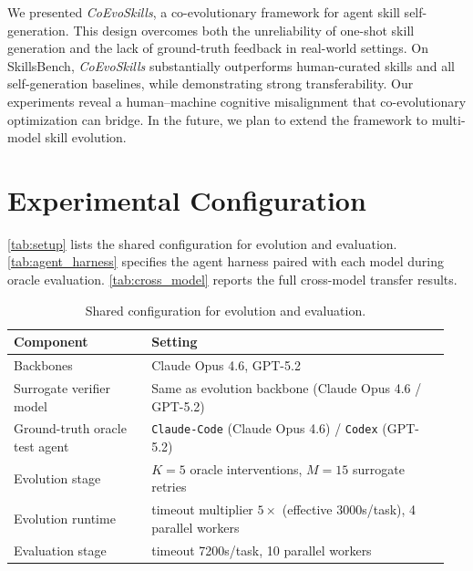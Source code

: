 \documentclass{article}
\newcommand{\method}{\textit{CoEvoSkills}\xspace}
\newcommand{\bench}{SkillsBench\xspace}
\begin{document}
We presented \method, a co-evolutionary framework for agent skill self-generation. This design overcomes both the unreliability of one-shot skill generation and the lack of ground-truth feedback in real-world settings.
On \bench, \method substantially outperforms human-curated skills and all self-generation baselines, while demonstrating strong transferability. Our experiments reveal a human--machine cognitive misalignment that co-evolutionary optimization can bridge.
In the future, we plan to extend the framework to multi-model skill evolution.




\appendix
{}
\renewcommand{\thetable}{\Alph{section}\arabic{table}}
\renewcommand{\thefigure}{\Alph{section}\arabic{figure}}
\section{Experimental Configuration}
\label{app:config}

\autoref{tab:setup} lists the shared configuration for evolution and evaluation. \autoref{tab:agent_harness} specifies the agent harness paired with each model during oracle evaluation. \autoref{tab:cross_model} reports the full cross-model transfer results.

\begin{table}[ht!]
\centering
\caption{Shared configuration for evolution and evaluation.}
\label{tab:setup}
\small
\begin{tabular}{@{}p{0.3\linewidth}p{0.65\linewidth}@{}}
\toprule
\textbf{Component} & \textbf{Setting} \\
\midrule
Backbones & Claude Opus 4.6, GPT-5.2 \\
Surrogate verifier model & Same as evolution backbone (Claude Opus 4.6 / GPT-5.2) \\
Ground-truth oracle test agent & \texttt{Claude-Code} (Claude Opus 4.6) / \texttt{Codex} (GPT-5.2) \\
Evolution stage & $K{=}5$ oracle interventions, $M{=}15$ surrogate retries \\
Evolution runtime & timeout multiplier $5\times$ (effective 3000s/task), 4 parallel workers \\
Evaluation stage & timeout 7200s/task, 10 parallel workers \\
\bottomrule
\end{tabular}
\end{table}
\end{document}
